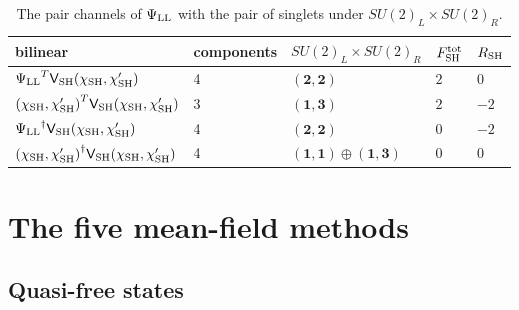\documentclass[aps,prd,onecolumn,superscriptaddress,nofootinbib,floatfix,longbibliography]{revtex4-2}
\newcommand{\LL}{{\rm LL}}
\begin{document}
\begin{table}[!htbp]
\caption{\label{tab:custodial}The pair channels of $\Psi_\LL$ with the pair of singlets under $SU(2)_L\times SU(2)_R$.}
\begingroup\centering\footnotesize\setlength{\tabcolsep}{4pt}
\begin{tabular}{lllll}
\hline\hline
bilinear & components & $SU(2)_L\times SU(2)_R$ & $F^{\rm tot}_{\rm SH}$ & $R_{\rm SH}$ \\ \hline
${\Psi_{\rm LL}}^T\mathsf V_{\rm SH}(\chi_{\rm SH},\chi'_{\rm SH})$ & 4 & $(\mathbf 2,\mathbf 2)$ & $2$ & $0$ \\
${(\chi_{\rm SH},\chi'_{\rm SH})}^T\mathsf V_{\rm SH}(\chi_{\rm SH},\chi'_{\rm SH})$ & 3 & $(\mathbf 1,\mathbf 3)$ & $2$ & $-2$ \\
${\Psi_{\rm LL}}^\dagger\mathsf V_{\rm SH}(\chi_{\rm SH},\chi'_{\rm SH})$ & 4 & $(\mathbf 2,\mathbf 2)$ & $0$ & $-2$ \\
${(\chi_{\rm SH},\chi'_{\rm SH})}^\dagger\mathsf V_{\rm SH}(\chi_{\rm SH},\chi'_{\rm SH})$ & 4 & $(\mathbf 1,\mathbf 1)\oplus(\mathbf 1,\mathbf 3)$ & $0$ & $0$ \\
\hline\hline
\end{tabular}\par
\endgroup
\end{table}

\section{The five mean-field methods}
\label{sec:methods}

\subsection{Quasi-free states}
\end{document}
